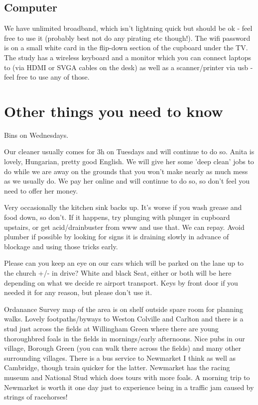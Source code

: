 \documentclass[11pt]{article}
\begin{document}
\subsection*{Computer}
We have unlimited broadband, which isn't lightning quick but should be ok - feel free to use it (probably best not do any pirating etc though!). The wifi password is on a small white card in the flip-down section of the cupboard under the TV. The study has a wireless keyboard and a monitor which you can connect laptops to (via HDMI or SVGA cables on the desk) as well as a scanner/printer via usb - feel free to use any of those.
\newpage
\section{Other things you need to know}
Bins on Wednesdays.

Our cleaner usually comes for 3h on Tuesdays and will continue to do so.  Anita is lovely, Hungarian, pretty good English.  We will give her some 'deep clean' jobs to do while we are away on the grounds that you won't make nearly as much mess as we usually do.  We pay her online and will continue to do so, so don't feel you need to offer her money.  

Very occasionally the kitchen sink backs up.  It's worse if you wash grease and food down, so don't.  If it happens, try plunging with plunger in cupboard upstairs, or get acid/drainbuster from www and use that.  We can repay.  Avoid plumber if possible by looking for signs it is draining slowly in advance of blockage and using those tricks early.  

Please can you keep an eye on our cars which will be parked on the lane up to the church +/- in drive?  White and black Seat, either or both will be here depending on what we decide re airport transport.  Keys by front door if you needed it for any reason, but please don't use it.  

Ordanance Survey map of the area is on shelf outside spare room for planning walks.  Lovely footpaths/byways to Weston Colville and Carlton and there is a stud just across the fields at Willingham Green where there are young thoroughbred foals in the fields in mornings/early afternoons.  Nice pubs in our village, Borough Green (you can walk there across the fields) and many other surrounding villages.  There is a bus service to Newmarket I think as well as Cambridge, though train quicker for the latter.  Newmarket has the racing museum and National Stud which does tours with more foals.  A morning trip to Newmarket is worth it one day just to experience being in a traffic jam caused by strings of racehorses!
\end{document}
